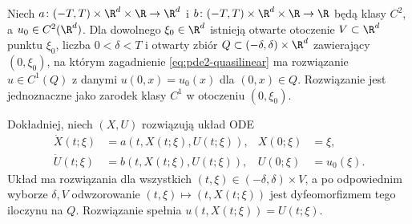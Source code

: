\begin{twierdzenie}
\label{thm:pde2-quasilinear}
Niech $a\colon(-T,T)\times\R^d\times\R\to\R^d$
i $b\colon(-T,T)\times\R^d\times\R\to\R$
będą klasy $C^2$, a $u_0\in C^2(\R^d)$.
Dla dowolnego $\xi_0\in\R^d$ istnieją otwarte otoczenie
$V\subset\R^d$ punktu $\xi_0$, liczba $0<\delta<T$
i otwarty zbiór $Q\subset(-\delta,\delta)\times\R^d$
zawierający $(0,\xi_0)$, na którym zagadnienie
\eqref{eq:pde2-quasilinear} ma rozwiązanie $u\in C^1(Q)$
z danymi $u(0,x)=u_0(x)$ dla $(0,x)\in Q$.
Rozwiązanie jest jednoznaczne jako zarodek klasy $C^1$
w otoczeniu $(0,\xi_0)$.

Dokładniej, niech $(X,U)$ rozwiązują układ ODE
\begin{equation}\label{eq:pde2-quasi-chars}
 \begin{aligned}
 \dot X(t;\xi)&=a(t,X(t;\xi),U(t;\xi)),& X(0;\xi)&=\xi,\\
 \dot U(t;\xi)&=b(t,X(t;\xi),U(t;\xi)),& U(0;\xi)&=u_0(\xi).
 \end{aligned}
\end{equation}
Układ ma rozwiązania dla wszystkich $(t,\xi)\in
(-\delta,\delta)\times V$, a po odpowiednim wyborze
$\delta,V$ odwzorowanie
$(t,\xi)\mapsto(t,X(t;\xi))$ jest dyfeomorfizmem
tego iloczynu na $Q$. Rozwiązanie spełnia
$u(t,X(t;\xi))=U(t;\xi)$.
\end{twierdzenie}
